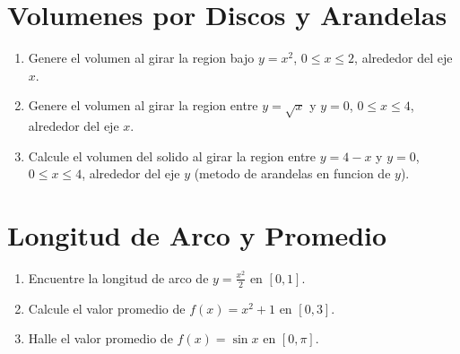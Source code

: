 \documentclass[12pt,a4paper]{article}
\begin{document}
\section{Volumenes por Discos y Arandelas}

\begin{enumerate}
    \item Genere el volumen al girar la region bajo $y=x^2$, $0\le x\le 2$, alrededor del eje $x$.
    \item Genere el volumen al girar la region entre $y=\sqrt{x}$ y $y=0$, $0\le x\le 4$, alrededor del eje $x$.
    \item Calcule el volumen del solido al girar la region entre $y=4-x$ y $y=0$, $0\le x\le 4$, alrededor del eje $y$ (metodo de arandelas en funcion de $y$).
\end{enumerate}

\section{Longitud de Arco y Promedio}

\begin{enumerate}
    \item Encuentre la longitud de arco de $y=\frac{x^2}{2}$ en $[0,1]$.
    \item Calcule el valor promedio de $f(x)=x^2+1$ en $[0,3]$.
    \item Halle el valor promedio de $f(x)=\sin x$ en $[0,\pi]$.
\end{enumerate}
\end{document}
